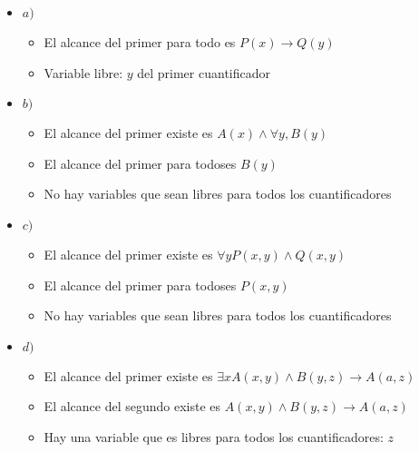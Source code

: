 \documentclass[12pt, fleqn]{article}                            %
\theoremstyle{break}                                            %
\newcommand \lLongTo {\longrightarrow}                          %
\begin{document}
    \begin{itemize}

        \item  $a)$
            \begin{itemize}
                \item El alcance del primer para todo es $P(x) \lLongTo Q(y)$
                \item Variable libre: $y$ del primer cuantificador
            \end{itemize}

        \item  $b)$
            \begin{itemize}
                \item El alcance del primer existe es $A(x) \wedge \forall y, B(y)$
                \item El alcance del primer para todoses $B(y)$
                \item No hay variables que sean libres para todos los cuantificadores
            \end{itemize}

        \item  $c)$
            \begin{itemize}
                \item El alcance del primer existe es 
                    $\forall y P(x, y) \wedge Q(x, y)$
                \item El alcance del primer para todoses $P(x, y)$
                \item No hay variables que sean libres para todos los cuantificadores
            \end{itemize}

        \item  $d)$
            \begin{itemize}
                \item El alcance del primer existe es 
                    $\exists x A(x, y) \wedge B(y, z) \lLongTo A(a, z)$
                \item El alcance del segundo existe es $A(x, y) \wedge B(y, z) \lLongTo A(a, z)$
                \item Hay una variable que es libres para todos los cuantificadores: $z$
            \end{itemize}

    \end{itemize}   



\clearpage
\end{document}

